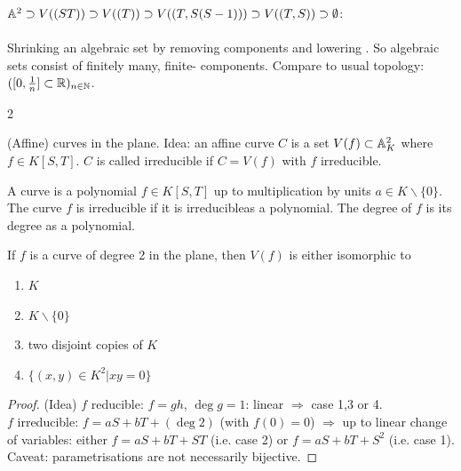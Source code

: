 \documentclass[a4paper,11pt]{article}
\begin{document}
			\begin{eg}
				$\AA^2\supset V((ST))\supset V((T))\supset V((T,S(S-1)))\supset V((T,S))\supset\emptyset$:\\
				\hfill{}\hfill{}\hfill{}\\
				Shrinking an algebraic set by removing components and lowering . So algebraic sets consist of finitely many, finite- components. Compare to usual topology: $([0,\frac{1}{n}]\subset\R)_{n\in\N}$.
			\end{eg}2

			\begin{eg}
				(Affine) curves in the plane. Idea: an affine curve $C$ is a set $V(f)\subset \AA^2_K$ where $f\in K[S,T]$. $C$ is called irreducible if $C=V(f)$ with $f$ irreducible.
			\end{eg}

			\begin{defi}
				A curve is a polynomial $f\in K[S,T]$ up to multiplication by units $a\in K\backslash\{0\}$. The curve $f$ is irreducible if it is irreducibleas a polynomial. The degree of $f$ is its degree as a polynomial.
			\end{defi}

			\begin{prop}
				If $f$ is a curve of degree 2 in the plane, then $V(f)$ is either isomorphic to 
				\begin{enumerate}
					\item $K\qquad$ 
					\item $K\backslash\{0\}\qquad$ 
					\item two disjoint copies of $K\qquad$ 
					\item $\{(x,y)\in K^2|xy=0\}\qquad$ 
				\end{enumerate}
			\end{prop}
			\begin{proof}\renewcommand{\qedsymbol}{}
				(Idea) $f$ reducible: $f=gh$, $\deg g=1$: linear $\Longrightarrow$ case 1,3 or 4.\\
				$f$ irreducible: $f=aS+bT+(\deg 2)$ (with $f(0)=0$) $\Longrightarrow$ up to linear change of variables: either $f=aS+bT+ST$ (i.e. case 2) or $f=aS+bT+S^2$ (i.e. case 1).
				\\Caveat: parametrisations are not necessarily bijective.
			\end{proof}\renewcommand{\qedsymbol}{$\square$}
\end{document}
